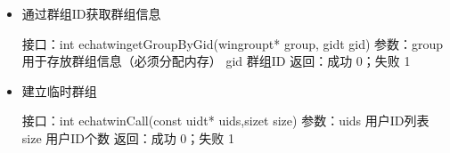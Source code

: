 \documentclass[letterpaper,10pt,english]{sphinxmanual}
\begin{document}
\begin{itemize}
\item {} 
通过群组ID获取群组信息

%
\begin{sphinxVerbatim}[commandchars=\\\{\}]
接口：int echat\PYGZus{}win\PYGZus{}getGroupByGid(win\PYGZus{}group\PYGZus{}t* group, gid\PYGZus{}t gid)
参数：group  用于存放群组信息（必须分配内存）
  gid  群组ID
返回：成功 0；失败 \PYGZhy{}1
\end{sphinxVerbatim}

\item {} 
建立临时群组

%
\begin{sphinxVerbatim}[commandchars=\\\{\}]
接口：int echat\PYGZus{}win\PYGZus{}Call(const uid\PYGZus{}t* uids,size\PYGZus{}t size)
参数：uids  用户ID列表
  size  用户ID个数
返回：成功 0；失败 \PYGZhy{}1
\end{sphinxVerbatim}

\end{itemize}
\end{document}
